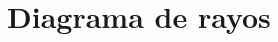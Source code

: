\documentclass[aspectratio=43, handout]{beamer}
\begin{document}













\section{Diagrama de rayos}
\end{document}
